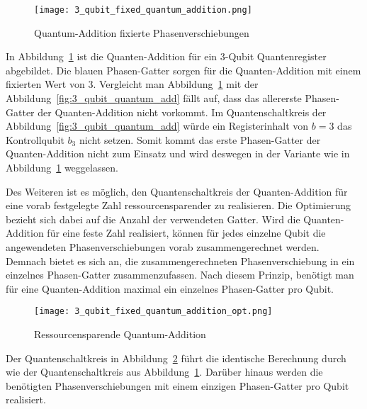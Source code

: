 \begin{figure}[H]
    \caption{Quantum-Addition fixierte Phasenverschiebungen}
    \label{fig:3_qubit_fixed_quantum_addition}
    \texttt{[image: 3\_qubit\_fixed\_quantum\_addition.png]}
    \centering
    \end{figure}
In Abbildung~\ref{fig:3_qubit_fixed_quantum_addition} ist die Quanten-Addition für ein 3-Qubit Quantenregister abgebildet.
Die blauen Phasen-Gatter sorgen für die Quanten-Addition mit einem fixierten Wert von \(3\).
Vergleicht man Abbildung~\ref{fig:3_qubit_fixed_quantum_addition} mit der Abbildung~\ref{fig:3_qubit_quantum_add} fällt auf, 
dass das allererste Phasen-Gatter der Quanten-Addition nicht vorkommt.
Im Quantenschaltkreis der Abbildung~\ref{fig:3_qubit_quantum_add} würde ein Registerinhalt von \(b = 3\) das Kontrollqubit \(b_3\) nicht setzen. 
Somit kommt das erste Phasen-Gatter der Quanten-Addition nicht zum Einsatz und 
wird deswegen in der Variante wie in Abbildung~\ref{fig:3_qubit_fixed_quantum_addition} weggelassen. 

Des Weiteren ist es möglich, 
den Quantenschaltkreis der Quanten-Addition für eine vorab festgelegte Zahl ressourcensparender zu realisieren.
Die Optimierung bezieht sich dabei auf die Anzahl der verwendeten Gatter.
Wird die Quanten-Addition für eine feste Zahl realisiert, 
können für jedes einzelne Qubit die angewendeten Phasenverschiebungen vorab zusammengerechnet werden.
Demnach bietet es sich an, 
die zusammengerechneten Phasenverschiebung in ein einzelnes Phasen-Gatter zusammenzufassen.
Nach diesem Prinzip, benötigt man für eine Quanten-Addition maximal ein einzelnes Phasen-Gatter pro Qubit.

\begin{figure}[H]
  \caption{Ressourcensparende Quantum-Addition}
  \label{fig:3_qubit_fixed_quantum_addition_opt}
  \texttt{[image: 3\_qubit\_fixed\_quantum\_addition\_opt.png]}
  \centering
  \end{figure}
Der Quantenschaltkreis in Abbildung~\ref{fig:3_qubit_fixed_quantum_addition_opt} führt die identische 
Berechnung durch wie der Quantenschaltkreis aus Abbildung~\ref{fig:3_qubit_fixed_quantum_addition}.
Darüber hinaus werden die benötigten Phasenverschiebungen mit einem einzigen Phasen-Gatter pro Qubit realisiert.

